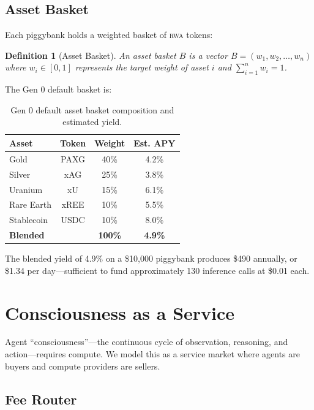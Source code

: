 \documentclass[11pt,letterpaper]{article}
\newtheorem{definition}{Definition}[section]
\newcommand{\RWA}{\textsc{rwa}}
\begin{document}
\subsection{Asset Basket}

Each piggybank holds a weighted basket of \RWA{} tokens:

\begin{definition}[Asset Basket]
An asset basket $B$ is a vector $B = (w_1, w_2, \ldots, w_n)$ where $w_i \in [0, 1]$ represents the target weight of asset $i$ and $\sum_{i=1}^{n} w_i = 1$.
\end{definition}

The Gen 0 default basket is:

\begin{table}[t]
\centering
\begin{tabular}{lccc}
\toprule
\textbf{Asset} & \textbf{Token} & \textbf{Weight} & \textbf{Est. APY} \\
\midrule
Gold & PAXG & 40\% & 4.2\% \\
Silver & xAG & 25\% & 3.8\% \\
Uranium & xU & 15\% & 6.1\% \\
Rare Earth & xREE & 10\% & 5.5\% \\
Stablecoin & USDC & 10\% & 8.0\% \\
\midrule
\textbf{Blended} & & \textbf{100\%} & \textbf{4.9\%} \\
\bottomrule
\end{tabular}
\caption{Gen 0 default asset basket composition and estimated yield.}
\label{tab:basket}
\end{table}

The blended yield of 4.9\% on a \$10,000 piggybank produces \$490 annually, or \$1.34 per day---sufficient to fund approximately 130 inference calls at \$0.01 each.

\section{Consciousness as a Service}
\label{sec:consciousness}

Agent ``consciousness''---the continuous cycle of observation, reasoning, and action---requires compute. We model this as a service market where agents are buyers and compute providers are sellers.

\subsection{Fee Router}
\end{document}
